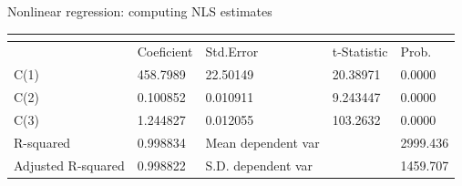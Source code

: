 \documentclass{beamer}
\begin{document}
\begin{frame}{Nonlinear regression: computing NLS estimates}
\begin{table}[]
\begin{tabular}{@{}lllll@{}}
\multicolumn{5}{l}{}                                                                                                                                                                                                                                                                                                                       \\ \midrule
                                                                      & Coeficient                                                    & Std.Error                                                             & t-Statistic                                                   & Prob.                                                      \\ \midrule
C(1)                                                                  & 458.7989                                                      & 22.50149                                                              & 20.38971                                                      & 0.0000                                                     \\
C(2)                                                                  & 0.100852                                                      & 0.010911                                                              & 9.243447                                                      & 0.0000                                                     \\
C(3)                                                                  & 1.244827                                                      & 0.012055                                                              & 103.2632                                                      & 0.0000                                                     \\ \midrule
R-squared                                                             & 0.998834                                                      & Mean dependent var                                                    &                                                               & 2999.436                                                   \\
Adjusted R-squared                                                    & 0.998822                                                      & \multicolumn{2}{l}{S.D. dependent var}                                                                                                & 1459.707                                                   \\

\end{tabular}
\end{table}
\end{frame}
\end{document}
